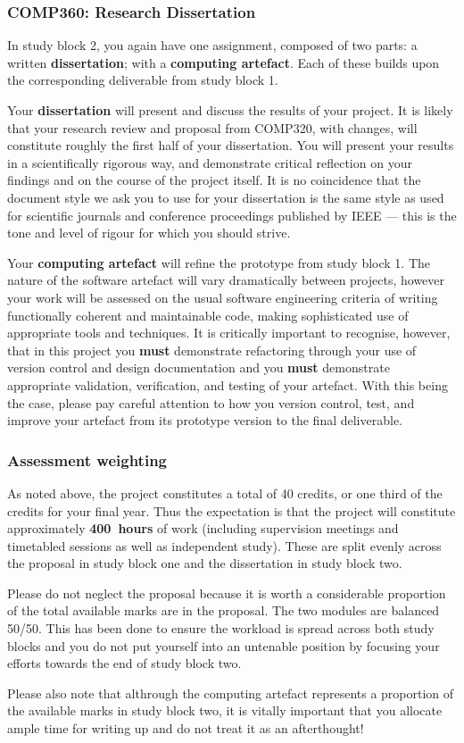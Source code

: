 \subsubsection*{COMP360: Research Dissertation}

In study block 2, you again have one assignment, composed of two parts: a written \textbf{dissertation};
with a \textbf{computing artefact}. Each of these builds upon the corresponding deliverable from study block 1.

Your \textbf{dissertation} will present and discuss the results of your project.
It is likely that your research review and proposal from COMP320, with changes, will constitute roughly the first half
of your dissertation.
You will present your results in a scientifically rigorous way, and demonstrate critical reflection
on your findings and on the course of the project itself.
It is no coincidence that the document style we ask you to use for your dissertation is the same style
as used for scientific journals and conference proceedings published by IEEE ---
this is the tone and level of rigour for which you should strive.

Your \textbf{computing artefact} will refine the prototype from study block 1.
The nature of the software artefact will vary dramatically between projects,
however your work will be assessed on the usual software engineering criteria of writing
functionally coherent and maintainable code, making sophisticated use of appropriate tools and techniques.
It is critically important to recognise, however, that in this project you \textbf{must} demonstrate refactoring
through your use of version control and design documentation and you  \textbf{must} demonstrate appropriate
validation, verification, and testing of your artefact. With this being the case, please pay careful attention to 
how you version control, test, and improve your artefact from its prototype version to the final deliverable.

\subsubsection*{Assessment weighting}

As noted above, the project constitutes a total of 40 credits, or one third of the credits for your final year.
Thus the expectation is that the project will constitute approximately \textbf{400~hours} of work 
(including supervision meetings and timetabled sessions as well as independent study). These are split evenly across the proposal in study block one and the dissertation in study block two.

Please do not neglect the proposal because it is worth a considerable proportion of the total available marks are in the proposal. The two modules are balanced 50/50. This has been done to ensure the workload is spread across both study blocks and you do not put yourself into an untenable position by focusing your efforts towards the end of study block two. 

Please also note that althrough the computing artefact represents a proportion of the available marks in study block two, it is vitally important that you allocate ample time for writing up and do not treat it as an afterthought!
